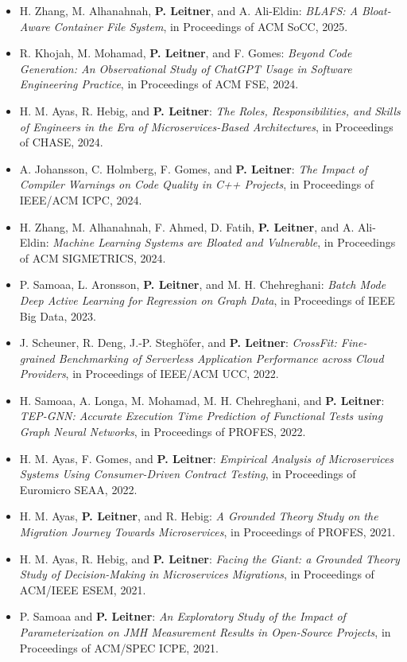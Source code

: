 \documentclass[a4paper,11pt]{article}
\begin{document}
\begin{itemize}[itemsep=0.2em]
\item H. Zhang, M. Alhanahnah, \textbf{P. Leitner}, and A. Ali-Eldin: \emph{BLAFS: A Bloat-Aware Container File System}, in Proceedings of ACM SoCC, 2025.
\item R. Khojah, M. Mohamad, \textbf{P. Leitner}, and F. Gomes: \emph{Beyond Code Generation: An Observational Study of ChatGPT Usage in Software Engineering Practice}, in Proceedings of ACM FSE, 2024.
\item H. M. Ayas, R. Hebig, and \textbf{P. Leitner}: \emph{The Roles, Responsibilities, and Skills of Engineers in the Era of Microservices-Based Architectures}, in Proceedings of CHASE, 2024.
\item A. Johansson, C. Holmberg, F. Gomes, and \textbf{P. Leitner}: \emph{The Impact of Compiler Warnings on Code Quality in C++ Projects}, in Proceedings of IEEE/ACM ICPC, 2024.
\item H. Zhang, M. Alhanahnah, F. Ahmed, D. Fatih, \textbf{P. Leitner}, and A. Ali-Eldin: \emph{Machine Learning Systems are Bloated and Vulnerable}, in Proceedings of ACM SIGMETRICS, 2024.
\item P. Samoaa, L. Aronsson, \textbf{P. Leitner}, and M. H. Chehreghani: \emph{Batch Mode Deep Active Learning for Regression on Graph Data}, in Proceedings of IEEE Big Data, 2023.
\item J. Scheuner, R. Deng, J.-P. Stegh\"{o}fer, and \textbf{P. Leitner}: \emph{CrossFit: Fine-grained Benchmarking of Serverless Application Performance across Cloud Providers}, in Proceedings of IEEE/ACM UCC, 2022.
\item H. Samoaa, A. Longa, M. Mohamad, M. H. Chehreghani, and \textbf{P. Leitner}: \emph{TEP-GNN: Accurate Execution Time Prediction of Functional Tests using Graph Neural Networks}, in Proceedings of PROFES, 2022.
\item H. M. Ayas, F. Gomes, and \textbf{P. Leitner}: \emph{Empirical Analysis of Microservices Systems Using Consumer-Driven Contract Testing}, in Proceedings of Euromicro SEAA, 2022.
\item H. M. Ayas, \textbf{P. Leitner}, and R. Hebig: \emph{A Grounded Theory Study on the Migration Journey Towards Microservices}, in Proceedings of PROFES, 2021.
\item H. M. Ayas, R. Hebig, and \textbf{P. Leitner}: \emph{Facing the Giant: a Grounded Theory Study of Decision-Making in Microservices Migrations}, in Proceedings of ACM/IEEE ESEM, 2021.
\item P. Samoaa and \textbf{P. Leitner}: \emph{An Exploratory Study of the Impact of Parameterization on JMH Measurement Results in Open-Source Projects}, in Proceedings of ACM/SPEC ICPE, 2021.

\end{itemize}
\end{document}
